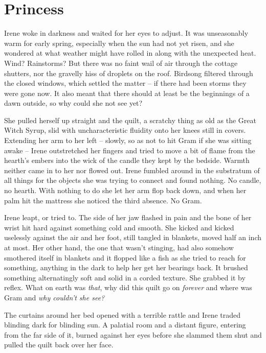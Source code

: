 \documentclass[../FGP.tex]{subfiles}
\begin{document}
\setmarginpargeometry
\section{Princess}
\begin{fragment}
Irene woke in darkness and waited for her eyes to adjust. It was unseasonably warm for early spring, especially when the sun had not yet risen, and she wondered at what weather might have rolled in along with the unexpected heat. Wind? Rainstorms? But there was no faint wail of air through the cottage shutters, nor the gravelly hiss of droplets on the roof. Birdsong filtered through the closed windows, which settled the matter -- if there had been storms they were gone now. It also meant that there should at least be the beginnings of a dawn outside, so why could she not see yet?

She pulled herself up straight and the quilt, a scratchy thing as old as the Great Witch Syrup, slid with uncharacteristic fluidity onto her knees still in covers. Extending her arm to her left -- slowly, so as not to hit Gram if she was sitting awake -- Irene outstretched her fingers and tried to move a bit of flame from the hearth's embers into the wick of the candle they kept by the bedside. Warmth neither came in to her nor flowed out. Irene fumbled around in the substratum of all things for the objects she was trying to connect and found nothing. No candle, no hearth. With nothing to do she let her arm flop back down, and when her palm hit the mattress she noticed the third absence. No Gram.

Irene leapt, or tried to. The side of her jaw flashed in pain and the bone of her wrist hit hard against something cold and smooth. She kicked and kicked uselessly against the air and her foot, still tangled in blankets, moved half an inch at most. Her other hand, the one that wasn't stinging, had also somehow smothered itself in blankets and it flopped like a fish as she tried to reach for something, anything in the dark to help her get her bearings back. It brushed something alternatingly soft and solid in a corded texture. She grabbed it by reflex. What on earth was \emph{that}, why did this quilt go on \emph{forever} and where was Gram and \emph{why couldn't she see?} 

The curtains around her bed opened with a terrible rattle and Irene traded blinding dark for blinding sun. A palatial room and a distant figure, entering from the far side of it, burned against her eyes before she slammed them shut and pulled the quilt back over her face. 


\end{fragment}
\end{document}
